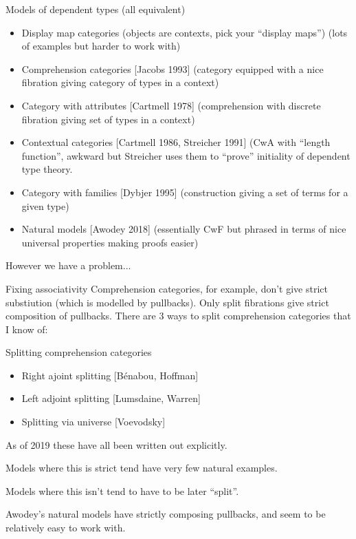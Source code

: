 \documentclass[usenames,dvipsnames]{beamer}
\begin{document}
    \begin{frame}{Models of dependent types (all equivalent)}
        \begin{itemize}
            \item Display map categories (objects are contexts, pick your ``display maps'') (lots of examples but harder to work with)
            \item Comprehension categories [Jacobs 1993] (category equipped with a nice fibration giving category of types in a context)
            \item Category with attributes [Cartmell 1978] (comprehension with discrete fibration giving set of types in a context)
            \item Contextual categories [Cartmell 1986, Streicher 1991] (CwA with ``length function'', awkward but Streicher uses them to ``prove'' initiality of dependent type theory.
            \item Category with families [Dybjer 1995] (construction giving a set of terms for a given type)
            \item Natural models [Awodey 2018] (essentially CwF but phrased in terms of nice universal properties making proofs easier)
        \end{itemize}
        
        However we have a problem...
    \end{frame}
    
    \begin{frame}{Fixing associativity}  
        Comprehension categories, for example, don't give strict substiution (which is modelled by pullbacks). Only split fibrations give strict composition of pullbacks. There are 3 ways to split comprehension categories that I know of:
        \begin{block}{Splitting comprehension categories}
            \begin{itemize}
                \item Right ajoint splitting [B\'enabou, Hoffman]
                \item Left adjoint splitting [Lumsdaine, Warren]
                \item Splitting via universe [Voevodsky]
            \end{itemize}
            As of 2019 these have all been written out explicitly.
        \end{block}
        
        Models where this is strict tend have very few natural examples.
        
        Models where this isn't tend to have to be later ``split''.
        
        
        Awodey's natural models have strictly composing pullbacks, and seem to be relatively easy to work with.
        
    \end{frame}
    
\end{document}

